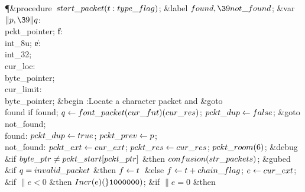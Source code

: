 \Y\P\4\&{procedure}\1\  $\\{start\_packet}(\|t:\\{type\_flag})$;\6
\4\&{label} $\\{found},\39\\{not\_found}$;\6
\4\&{var} $\|p,\39\|q$: \\{pckt\_pointer};\6
\|f: \\{int\_8u};\6
\|e: \\{int\_32};\6
\\{cur\_loc}: \\{byte\_pointer};\6
\\{cur\_limit}: \\{byte\_pointer};\2\6
\&{begin} :Locate a character packet and \&{goto} \\{found} if found\X;\6
$\|q\K\\{font\_packet}(\\{cur\_fnt})(\\{cur\_res})$;\5
$\\{pckt\_dup}\K\\{false}$;\5
\&{goto} \\{not\_found};\6
\4\\{found}: $\\{pckt\_dup}\K\\{true}$;\5
$\\{pckt\_prev}\K\|p$;\6
\4\\{not\_found}: $\\{pckt\_ext}\K\\{cur\_ext}$;\5
$\\{pckt\_res}\K\\{cur\_res}$;\5
$\\{pckt\_room}(6)$;\6
\&{debug} \&{if} $\\{byte\_ptr}\I\\{pckt\_start}[\\{pckt\_ptr}]$ \1\&{then}\5
$\\{confusion}(\\{str\_packets})$;\2\6
\&{gubed}\6
\&{if} $\|q=\\{invalid\_packet}$ \1\&{then}\5
$\|f\K\|t$\ \&{else} $\|f\K\|t+\\{chain\_flag}$;\2\6
$\|e\K\\{cur\_ext}$;\6
\&{if} $\|e<0$ \1\&{then}\5
$\\{Incr}(\|e)(\H{1000000})$;\2\6
\&{if} $\|e=0$ \1\&{then}\5
